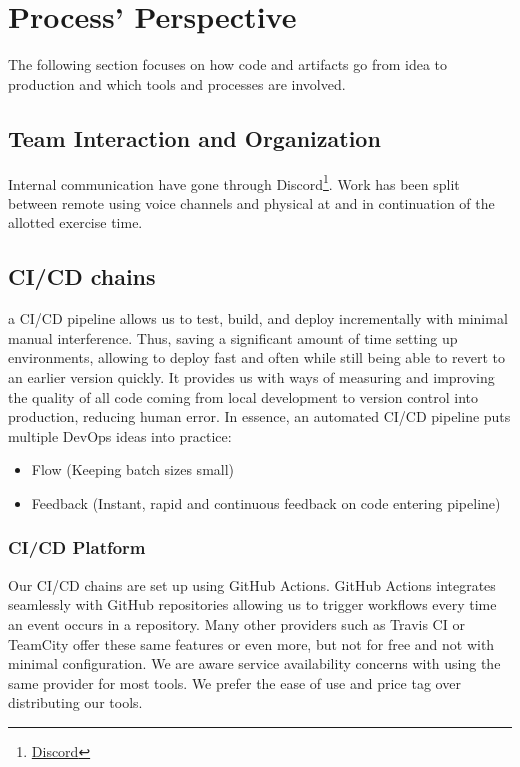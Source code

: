 \section{Process' Perspective}
\label{sec:processPerspective}
The following section focuses on how code and artifacts go from idea to production and which tools and processes are involved.
\subsection{Team Interaction and Organization}
\label{subsec:TeamInteraction}
Internal communication have gone through Discord\footnote{\href{https://discord.com/}{Discord}}. Work has been split between remote using voice channels and physical at and in continuation of the allotted exercise time.
\subsection{CI/CD chains}
\label{subsec:cicd}
a CI/CD pipeline allows us to test, build, and deploy \mini incrementally with minimal manual interference. Thus, saving a significant amount of time setting up environments, allowing to deploy fast and often while still being able to revert to an earlier version quickly.
It provides us with ways of measuring and improving the quality of all code coming from local development to version control into production, reducing human error.\cite{Chen2015}
In essence, an automated CI/CD pipeline puts multiple DevOps ideas into practice: 
\begin{itemize}
    \item Flow (Keeping batch sizes small)\cite{Kim2016}
    \item Feedback (Instant, rapid and continuous feedback on code entering pipeline)\cite{Kim2016}
\end{itemize}


\subsubsection{CI/CD Platform}
\label{subsubsec:cicdPlatform}
Our CI/CD chains are set up using GitHub Actions. GitHub Actions integrates seamlessly with GitHub repositories allowing us to trigger workflows every time an event occurs in a repository\cite{githubActions}. Many other providers such as Travis CI or TeamCity offer these same features or even more, but not for free and not with minimal configuration. We are aware service availability concerns with using the same provider for most tools. We prefer the ease of use and price tag over distributing our tools.

